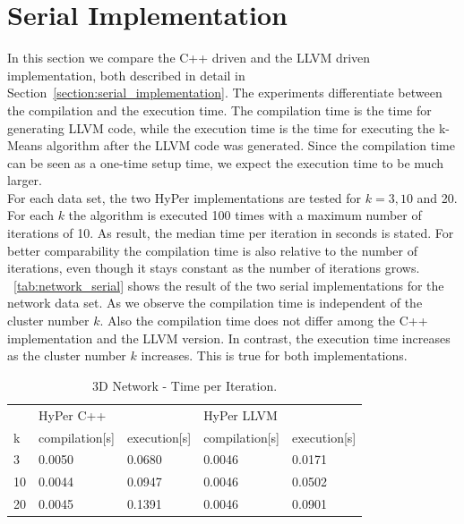 \section{Serial Implementation}\label{section:serial}

In this section we compare the C++ driven and the LLVM driven implementation, both described in detail in Section~\ref{section:serial_implementation}. The experiments differentiate between the compilation and the execution time. The compilation time is the time for generating LLVM code, while the execution time is the time for executing the k-Means algorithm after the LLVM code was generated. Since the compilation time can be seen as a one-time setup time, we expect the execution time to be much larger. 
\\
For each data set, the two HyPer implementations are tested for $k = 3,10$ and 20. For each $k$ the algorithm is executed 100 times with a maximum number of iterations of 10. As result, the median time per iteration in seconds is stated. For better comparability the compilation time is also relative to the number of iterations, even though it stays constant as the number of iterations grows.
\\
~\autoref{tab:network_serial} shows the result of the two serial implementations for the network data set. As we observe the compilation time is independent of the cluster number $k$. Also the compilation time does not differ among the C++ implementation and the LLVM version. In contrast, the execution time increases as the cluster number $k$ increases. This is true for both implementations. 

\begin{table}[htsb]
  \caption[3D Network - Time per Iteration]{3D Network - Time per Iteration.}\label{tab:network_serial}
  \centering
  \begin{tabular}{l l l l l}
    \toprule
      & HyPer C++ & & HyPer LLVM & \\
      k & compilation[s] & execution[s] & compilation[s] & execution[s] \\
    \midrule
      3 & 0.0050 & 0.0680 & 0.0046 & 0.0171 \\
      10 & 0.0044 & 0.0947 & 0.0046 & 0.0502 \\
      20 & 0.0045 & 0.1391 & 0.0046 & 0.0901 \\
    \bottomrule
  \end{tabular}
\end{table}



